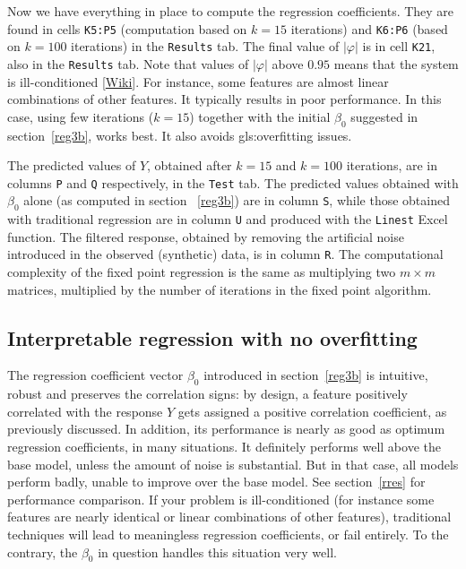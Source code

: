\documentclass[oneside,10pt]{book}
\begin{document}
Now we have everything in place to compute the regression coefficients. They are found in cells \texttt{K5:P5} (computation based on $k=15$ iterations) and  \texttt{K6:P6} (based on $k=100$ iterations) in the \texttt{Results} tab. The final value of $|\varphi|$ is in cell \texttt{K21}, also in the \texttt{Results} tab. Note that values of $|\varphi|$ above $0.95$ means that the system is \textcolor{index}{ill-conditioned} [\href{https://en.wikipedia.org/wiki/Condition_number}{Wiki}]. For instance, some features are almost linear combinations of other features. It typically results in poor performance. In this case, using few iterations ($k=15$) together with the initial $\beta_0$ suggested in section~\ref{reg3b}, works best. It also avoids \gls{gls:overfitting} issues.

The predicted values of $Y$, obtained after $k=15$ and $k=100$ iterations, are in columns \texttt{P} and \texttt{Q} respectively, in the \texttt{Test} tab. The predicted values obtained with $\beta_0$ alone (as computed in section ~\ref{reg3b}) are in column \texttt{S}, while those obtained with traditional regression are in column \texttt{U} and produced with the \texttt{Linest} Excel function. The filtered response, obtained by removing the artificial noise introduced in the observed (synthetic) data, is in column \texttt{R}. The computational complexity of the fixed point regression is the same as multiplying two $m\times m$ matrices, multiplied by the number of iterations in the fixed point algorithm.


\subsection{Interpretable regression with no overfitting}

The regression coefficient vector $\beta_0$ introduced in section~\ref{reg3b} is intuitive, robust and preserves the correlation signs: by design, a feature positively correlated with the
response $Y$ gets assigned a positive correlation coefficient, as previously discussed.  In addition, its performance is nearly as good as optimum regression
 coefficients,  in many situations. It definitely performs well above the base model, unless the amount of noise is substantial. But in that case, all models perform badly, unable to
improve over the base model. See section~\ref{rres} for performance comparison. If your problem is ill-conditioned (for instance some features are nearly identical or linear combinations of other features), traditional techniques will lead to meaningless regression coefficients, or fail entirely. To the contrary, the $\beta_0$ in question handles this situation very well.
\end{document}
